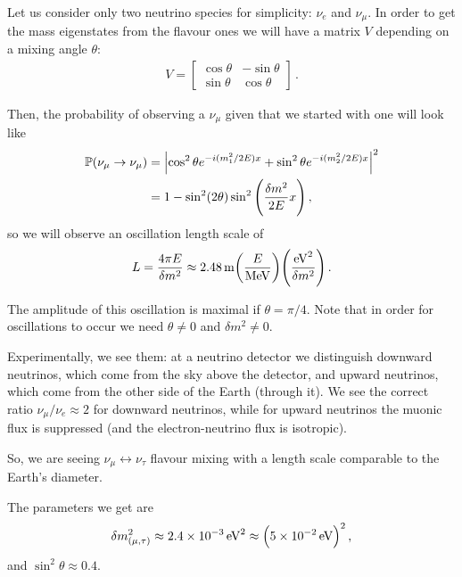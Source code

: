 \documentclass[main.tex]{subfiles}
\begin{document}
Let us consider only two neutrino species for simplicity: \(\nu_{e}\) and \(\nu_{\mu }\). In order to get the mass eigenstates from the flavour ones we will have a matrix \(V\) depending on a mixing angle \(\theta \): 
%
\begin{align}
V = \left[\begin{array}{cc}
\cos \theta  & -\sin \theta  \\ 
\sin \theta  & \cos \theta 
\end{array}\right]
\,.
\end{align}

Then, the probability of observing a \(\nu_{\mu }\) given that we started with one will look like 
%
\begin{align}
\mathbb{P} (\nu_{\mu } \to \nu_{\mu })
&= \abs{
    \cos^2\theta e^{-i (m_1^2 / 2E )x}+
    \sin^2\theta e^{-i (m_2^2 / 2E )x}
}^2  \\
&= 1 - \sin^2 (2 \theta ) \sin^2 \qty( \frac{ \delta m^2}{2E} x)
\,,
\end{align}
%
so we will observe an oscillation length scale of 
%
\begin{align}
L = \frac{4 \pi E}{ \delta m^2} \approx \SI{2.48}{m} \qty( \frac{E}{\SI{}{MeV}}) \qty( \frac{ \SI{}{eV^2}}{ \delta m^2})
\,.
\end{align}

The amplitude of this oscillation is maximal if \(\theta= \pi /4\). 
Note that in order for oscillations to occur we need \(\theta \neq 0\) and \(\delta m^2 \neq 0\). 

Experimentally, we see them: at a neutrino detector we distinguish downward neutrinos, which come from the sky above the detector, and upward neutrinos, which come from the other side of the Earth (through it). 
We see the correct ratio \(\nu_{\mu } / \nu_{e} \approx 2\) for downward neutrinos, while for upward neutrinos the muonic flux is suppressed (and the electron-neutrino flux is isotropic).

So, we are seeing \(\nu_{\mu } \leftrightarrow \nu_{\tau }\) flavour mixing with a length scale comparable to the Earth's diameter. 


The parameters we get are 
%
\begin{align}
\delta m^2_{(\mu, \tau )} \approx \SI{2.4e-3}{eV^2} \approx \qty(\SI{5e-2}{eV})^2
\,,
\end{align}
%
and \(\sin^2\theta \approx 0.4\).
\end{document}
